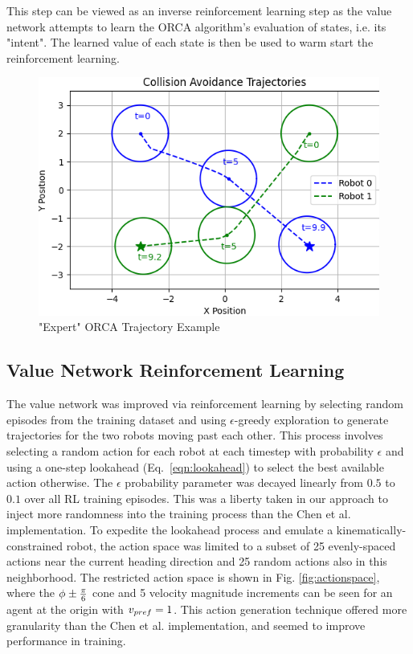 \documentclass[conference]{IEEEtran}
\begin{document}
This step can be viewed as an inverse reinforcement learning step as the value network attempts to learn the ORCA algorithm's evaluation of states, i.e. its "intent". The learned value of each state is then be used to warm start the reinforcement learning.
\begin{figure}[h!]
    \includegraphics[width=0.9\linewidth]{docs/latex/figures/ORCA_Example_1.png}
    \caption{ "Expert" ORCA Trajectory Example}
    \label{fig:ORCA}
\end{figure}

\subsection{Value Network Reinforcement Learning}
The value network was improved via reinforcement learning by selecting random episodes from the training dataset and using $\epsilon$-greedy exploration to generate trajectories for the two robots moving past each other. This process involves selecting a random action for each robot at each timestep with probability $\epsilon$ and using a one-step lookahead (Eq.~\ref{eqn:lookahead}) to select the best available action otherwise. The $\epsilon$ probability parameter was decayed linearly from $0.5$ to $0.1$ over all RL training episodes. This was a liberty taken in our approach to inject more randomness into the training process than the Chen et al. implementation. To expedite the lookahead process and emulate a kinematically-constrained robot, the action space was limited to a subset of 25 evenly-spaced actions near the current heading direction and 25 random actions also in this neighborhood. The restricted action space is shown in Fig. \ref{fig:actionspace}, where the $\phi_{}\pm\frac{\pi}{6}$ cone and 5 velocity magnitude increments can be seen for an agent at the origin with $v_{pref}=1$. This action generation technique offered more granularity than the Chen et al. implementation, and seemed to improve performance in training.
\end{document}
